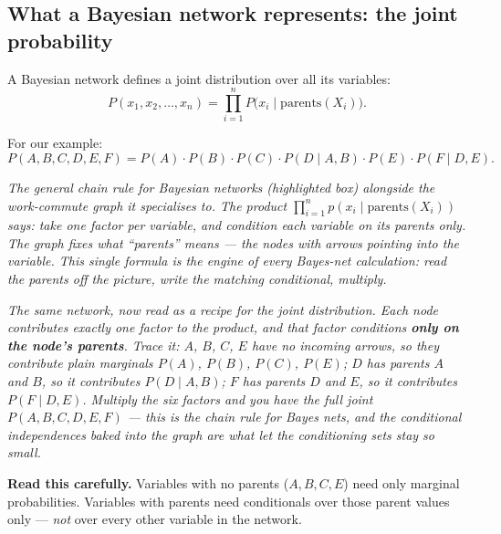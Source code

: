 \documentclass[11pt, a4paper]{article}
\begin{document}
\subsection{What a Bayesian network represents: the joint probability}

\begin{defbox}
A Bayesian network defines a joint distribution over all its variables:
\[
P(x_1, x_2, \dots, x_n) = \prod_{i=1}^n P\bigl(x_i \mid \mathrm{parents}(X_i)\bigr).
\]
\end{defbox}

For our example:
\[
P(A, B, C, D, E, F) = P(A) \cdot P(B) \cdot P(C) \cdot P(D \mid A, B) \cdot P(E) \cdot P(F \mid D, E).
\]

\begin{center}

\footnotesize\textit{The general chain rule for Bayesian networks (highlighted box) alongside the work-commute graph it specialises to. The product $\prod_{i=1}^n p(x_i \mid \mathrm{parents}(X_i))$ says: take one factor per variable, and condition each variable on its parents only. The graph fixes what ``parents'' means --- the nodes with arrows pointing \emph{into} the variable. This single formula is the engine of every Bayes-net calculation: read the parents off the picture, write the matching conditional, multiply.}
\end{center}

\begin{center}

\footnotesize\textit{The same network, now read as a recipe for the joint distribution. Each node contributes exactly one factor to the product, and that factor conditions \textbf{only on the node's parents}. Trace it: $A$, $B$, $C$, $E$ have no incoming arrows, so they contribute plain marginals $P(A)$, $P(B)$, $P(C)$, $P(E)$; $D$ has parents $A$ and $B$, so it contributes $P(D \mid A, B)$; $F$ has parents $D$ and $E$, so it contributes $P(F \mid D, E)$. Multiply the six factors and you have the full joint $P(A,B,C,D,E,F)$ --- this is the chain rule for Bayes nets, and the conditional independences baked into the graph are what let the conditioning sets stay so small.}
\end{center}

\textbf{Read this carefully.} Variables with no parents ($A, B, C, E$) need only marginal probabilities. Variables with parents need conditionals over those parent values only — \emph{not} over every other variable in the network.
\end{document}
